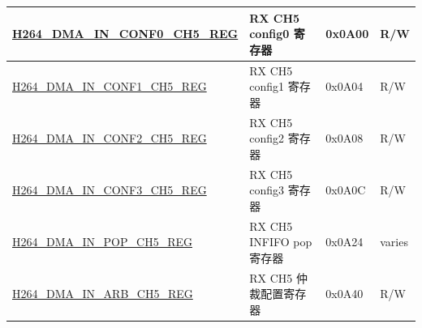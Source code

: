 \begin{longtable}{ | p{7.5cm} | p{5.7cm} | p{1.2cm} | p{1cm} | }
    \hyperref[regdesc:H264DMAINCONF0CH5REG]{H264\_DMA\_IN\_CONF0\_CH5\_REG} & RX CH5 config0 寄存器 & 0x0A00 & R/W \\ \hline
    \hyperref[regdesc:H264DMAINCONF1CH5REG]{H264\_DMA\_IN\_CONF1\_CH5\_REG} & RX CH5 config1 寄存器 & 0x0A04 & R/W \\ \hline
    \hyperref[regdesc:H264DMAINCONF2CH5REG]{H264\_DMA\_IN\_CONF2\_CH5\_REG} & RX CH5 config2 寄存器 & 0x0A08 & R/W \\ \hline
    \hyperref[regdesc:H264DMAINCONF3CH5REG]{H264\_DMA\_IN\_CONF3\_CH5\_REG} & RX CH5 config3 寄存器 & 0x0A0C & R/W \\ \hline
    \hyperref[regdesc:H264DMAINPOPCH5REG]{H264\_DMA\_IN\_POP\_CH5\_REG} & RX CH5 INFIFO pop 寄存器 & 0x0A24 & varies \\ \hline
    \hyperref[regdesc:H264DMAINARBCH5REG]{H264\_DMA\_IN\_ARB\_CH5\_REG} & RX CH5 仲裁配置寄存器 & 0x0A40 & R/W \\ \hline


\end{longtable}
